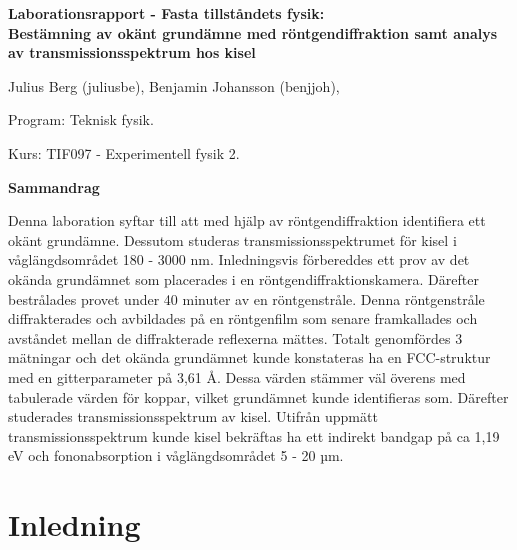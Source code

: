 \documentclass[12pt, a4paper]{article}
\begin{document}
\thispagestyle{empty}
\begin{center}
{\huge\bf Laborationsrapport - Fasta tillståndets fysik:\\}
\vspace{0.2cm}
{\Large\bf 
Bestämning av okänt grundämne med röntgendiffraktion samt analys av transmissionsspektrum hos kisel}
\end{center}
\vspace{0.2cm}
\begin{center}
Julius Berg (juliusbe), Benjamin Johansson (benjjoh), \par
Program: Teknisk fysik. \par
Kurs: TIF097 - Experimentell fysik 2.
\end{center}
\vspace{1.0cm}
\centerline{\bf Sammandrag}

Denna laboration syftar till att med hjälp av röntgendiffraktion identifiera ett okänt grundämne.
Dessutom studeras transmissionsspektrumet för kisel i våglängdsområdet 180 - 3000 nm.
Inledningsvis förbereddes ett prov av det okända grundämnet som placerades i en röntgendiffraktionskamera.
Därefter bestrålades provet under 40 minuter av en röntgenstråle.
Denna röntgenstråle diffrakterades och avbildades på en röntgenfilm som senare framkallades och avståndet mellan de diffrakterade reflexerna mättes.
Totalt genomfördes 3 mätningar och det okända grundämnet kunde konstateras ha en FCC-struktur med en gitterparameter på 3,61 Å.
Dessa värden stämmer väl överens med tabulerade värden för koppar, vilket grundämnet kunde identifieras som.
Därefter studerades transmissionsspektrum av kisel. 
Utifrån uppmätt transmissionsspektrum kunde kisel bekräftas ha ett indirekt bandgap på ca 1,19 eV
och fononabsorption i våglängdsområdet 5 - 20 µm.

\newpage
\tableofcontents
\newpage

\section{Inledning}
\end{document}
